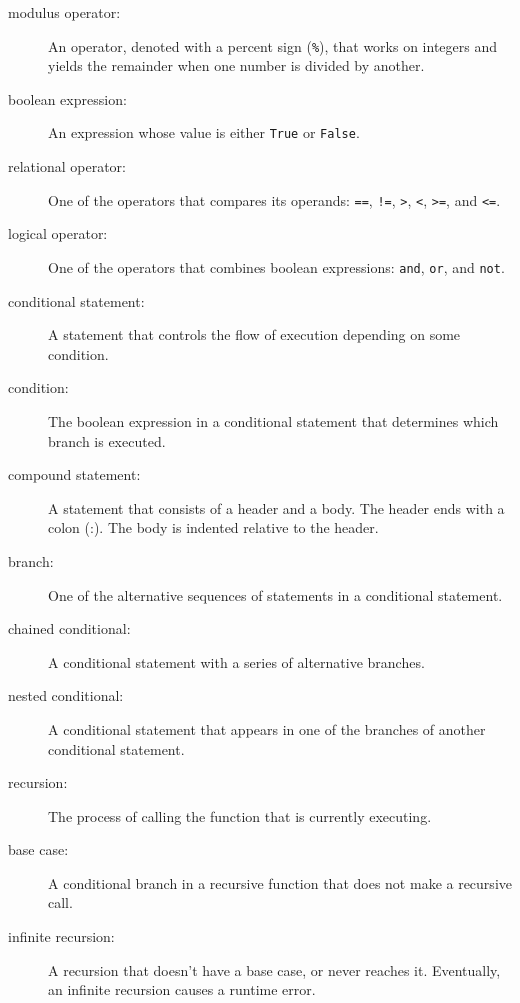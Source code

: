 \documentclass[10pt]{book}
\begin{document}
\begin{description}

\item[modulus operator:]  An operator, denoted with a percent sign
({\tt \%}), that works on integers and yields the remainder when one
number is divided by another.

\item[boolean expression:]  An expression whose value is either 
{\tt True} or {\tt False}.

\item[relational operator:] One of the operators that compares
its operands: {\tt ==}, {\tt !=}, {\tt >}, {\tt <}, {\tt >=}, and {\tt <=}.

\item[logical operator:] One of the operators that combines boolean
expressions: {\tt and}, {\tt or}, and {\tt not}.

\item[conditional statement:]  A statement that controls the flow of
execution depending on some condition.

\item[condition:] The boolean expression in a conditional statement
that determines which branch is executed.

\item[compound statement:]  A statement that consists of a header
and a body.  The header ends with a colon (:).  The body is indented
relative to the header.

\item[branch:] One of the alternative sequences of statements in
a conditional statement.

\item[chained conditional:]  A conditional statement with a series
of alternative branches.

\item[nested conditional:]  A conditional statement that appears
in one of the branches of another conditional statement.

\item[recursion:]  The process of calling the function that is
currently executing.

\item[base case:]  A conditional branch in a
recursive function that does not make a recursive call.

\item[infinite recursion:]  A recursion that doesn't have a
base case, or never reaches it.  Eventually, an infinite recursion
causes a runtime error.

\end{description}
\end{document}
